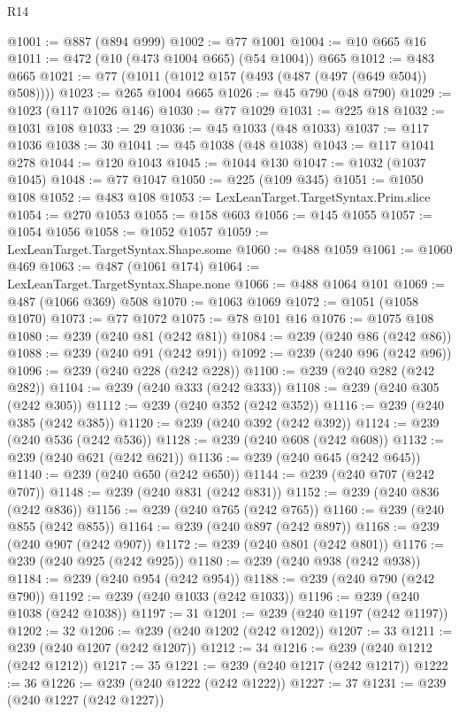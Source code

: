 \begin{lexlean}{R14}
\begin{coremodule}
{{{{{{{{{{{{{{{{{{{{{{{{{{{{{{{{{{{{{{{{{{{{{{{{{{{{{{{{{{{{{{{{{{{{{{{{{{{{{{{{{{{{{{{{{{{{{{{{{{{{{{{{{{@1001 := @887 (@894 @999)
@1002 := @77 @1001
@1004 := @10 @665 @16
@1011 := @472 (@10 (@473 @1004 @665) (@54 @1004)) @665
@1012 := @483 @665
@1021 := @77 (@1011 (@1012 @157 (@493 (@487 (@497 (@649 @504)) @508))))
@1023 := @265 @1004 @665
@1026 := @45 @790 (@48 @790)
@1029 := @1023 (@117 @1026 @146)
@1030 := @77 @1029
@1031 := @225 @18
@1032 := @1031 @108
@1033 := 29
@1036 := @45 @1033 (@48 @1033)
@1037 := @117 @1036
@1038 := 30
@1041 := @45 @1038 (@48 @1038)
@1043 := @117 @1041 @278
@1044 := @120 @1043
@1045 := @1044 @130
@1047 := @1032 (@1037 @1045)
@1048 := @77 @1047
@1050 := @225 (@109 @345)
@1051 := @1050 @108
@1052 := @483 @108
@1053 := LexLeanTarget.TargetSyntax.Prim.slice
@1054 := @270 @1053
@1055 := @158 @603
@1056 := @145 @1055
@1057 := @1054 @1056
@1058 := @1052 @1057
@1059 := LexLeanTarget.TargetSyntax.Shape.some
@1060 := @488 @1059
@1061 := @1060 @469
@1063 := @487 (@1061 @174)
@1064 := LexLeanTarget.TargetSyntax.Shape.none
@1066 := @488 @1064 @101
@1069 := @487 (@1066 @369) @508
@1070 := @1063 @1069
@1072 := @1051 (@1058 @1070)
@1073 := @77 @1072
@1075 := @78 @101 @16
@1076 := @1075 @108
@1080 := @239 (@240 @81 (@242 @81))
@1084 := @239 (@240 @86 (@242 @86))
@1088 := @239 (@240 @91 (@242 @91))
@1092 := @239 (@240 @96 (@242 @96))
@1096 := @239 (@240 @228 (@242 @228))
@1100 := @239 (@240 @282 (@242 @282))
@1104 := @239 (@240 @333 (@242 @333))
@1108 := @239 (@240 @305 (@242 @305))
@1112 := @239 (@240 @352 (@242 @352))
@1116 := @239 (@240 @385 (@242 @385))
@1120 := @239 (@240 @392 (@242 @392))
@1124 := @239 (@240 @536 (@242 @536))
@1128 := @239 (@240 @608 (@242 @608))
@1132 := @239 (@240 @621 (@242 @621))
@1136 := @239 (@240 @645 (@242 @645))
@1140 := @239 (@240 @650 (@242 @650))
@1144 := @239 (@240 @707 (@242 @707))
@1148 := @239 (@240 @831 (@242 @831))
@1152 := @239 (@240 @836 (@242 @836))
@1156 := @239 (@240 @765 (@242 @765))
@1160 := @239 (@240 @855 (@242 @855))
@1164 := @239 (@240 @897 (@242 @897))
@1168 := @239 (@240 @907 (@242 @907))
@1172 := @239 (@240 @801 (@242 @801))
@1176 := @239 (@240 @925 (@242 @925))
@1180 := @239 (@240 @938 (@242 @938))
@1184 := @239 (@240 @954 (@242 @954))
@1188 := @239 (@240 @790 (@242 @790))
@1192 := @239 (@240 @1033 (@242 @1033))
@1196 := @239 (@240 @1038 (@242 @1038))
@1197 := 31
@1201 := @239 (@240 @1197 (@242 @1197))
@1202 := 32
@1206 := @239 (@240 @1202 (@242 @1202))
@1207 := 33
@1211 := @239 (@240 @1207 (@242 @1207))
@1212 := 34
@1216 := @239 (@240 @1212 (@242 @1212))
@1217 := 35
@1221 := @239 (@240 @1217 (@242 @1217))
@1222 := 36
@1226 := @239 (@240 @1222 (@242 @1222))
@1227 := 37
@1231 := @239 (@240 @1227 (@242 @1227))
}}}}}}}}}}}}}}}}}}}}}}}}}}}}}}}}}}}}}}}}}}}}}}}}}}}}}}}}}}}}}}}}}}}}}}}}}}}}}}}}}}}}}}}}}}}}}}}}}}}}}}}}}}
\end{coremodule}
\end{lexlean}
